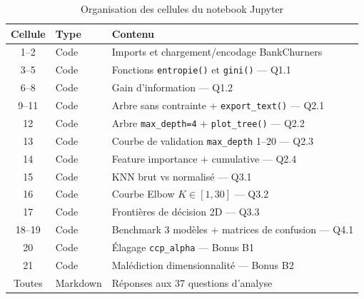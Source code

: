 \documentclass[12pt,a4paper]{article}
\begin{document}
\begin{table}[H]
\centering
\caption{Organisation des cellules du notebook Jupyter}
\begin{tabular}{cll}
\toprule
\textbf{Cellule} & \textbf{Type} & \textbf{Contenu} \\
\midrule
1--2  & Code   & Imports et chargement/encodage BankChurners \\
3--5  & Code   & Fonctions \texttt{entropie()} et \texttt{gini()} — Q1.1 \\
6--8  & Code   & Gain d'information — Q1.2 \\
9--11 & Code   & Arbre sans contrainte + \texttt{export\_text()} — Q2.1 \\
12    & Code   & Arbre \texttt{max\_depth=4} + \texttt{plot\_tree()} — Q2.2 \\
13    & Code   & Courbe de validation \texttt{max\_depth} 1--20 — Q2.3 \\
14    & Code   & Feature importance + cumulative — Q2.4 \\
15    & Code   & KNN brut vs normalisé — Q3.1 \\
16    & Code   & Courbe Elbow $K \in [1,30]$ — Q3.2 \\
17    & Code   & Frontières de décision 2D — Q3.3 \\
18--19 & Code  & Benchmark 3 modèles + matrices de confusion — Q4.1 \\
20    & Code   & Élagage \texttt{ccp\_alpha} — Bonus B1 \\
21    & Code   & Malédiction dimensionnalité — Bonus B2 \\
Toutes & Markdown & Réponses aux 37 questions d'analyse \\
\bottomrule
\end{tabular}
\end{table}
\end{document}
